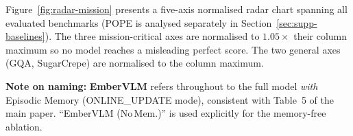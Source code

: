 \documentclass[runningheads]{llncs}
\begin{document}
Figure~\ref{fig:radar-mission} presents a five-axis normalised radar chart spanning
all evaluated benchmarks (POPE is analysed separately in
Section~\ref{sec:supp-baselines}). The three mission-critical axes are normalised
to $1.05\times$ their column maximum so no model reaches a misleading perfect score.
The two general axes (GQA, SugarCrepe) are normalised to the column maximum.

\noindent\textbf{Note on naming:} \textbf{EmberVLM} refers throughout to the full
model \textit{with} Episodic Memory (ONLINE\_UPDATE mode), consistent with
Table~5 of the main paper. ``EmberVLM (No\,Mem.)'' is used explicitly for the
memory-free ablation.

%
%
%
%
%
%
%
\end{document}
